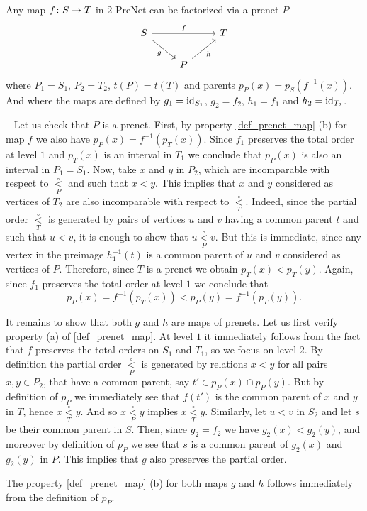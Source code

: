 \documentclass[letterpaper,12pt,leqno]{article}
\numberwithin{equation}{theorem}
\def\PreNet{\textrm{-}\mathrm{PreNet}}
\def\proof{\noindent{\em Proof:}\ }
\def\lesub{\mathop{<}\limits}
\def\pless{\lesub^\circ}
\begin{document}
\begin{lemma}
\label{lemma_map_factor}
Any map $f\colon S \to T$ in $2\PreNet$ can be factorized via a prenet $P$
$$
\begin{tikzcd}
S \ar[rr, "f"] \ar[dr, "g"'] && T \\
& P \ar[ur, "h"'] &
\end{tikzcd}
$$
where $P_1 = S_1$, $P_2 = T_2$, $t(P) = t(T)$ and parents $p_P(x) = p_S(f^{-1}(x))$. And where the maps are defined by $g_1 = \mathrm{id}_{S_1}$, $g_2 = f_2$, $h_1 = f_1$ and $h_2 = \mathrm{id}_{T_2}$.
\end{lemma}
\proof
Let us check that $P$ is a prenet. First, by property \ref{def_prenet_map} (b) for map $f$ we also have $p_P(x) = f^{-1}(p_T(x))$. Since $f_1$ preserves the total order at level $1$
and $p_T(x)$ is an interval in $T_1$ we conclude that $p_P(x)$ is also an interval in $P_1 = S_1$. Now, take $x$ and $y$ in $P_2$, which are incomparable with respect to $\pless_P$ and such that $x < y$.
This implies that $x$ and $y$ considered as vertices of $T_2$ are also incomparable with respect to $\pless_T$. Indeed, since the partial order $\pless_T$ is generated by pairs of vertices $u$ and $v$ having
a common parent $t$ and such that $u < v$, it is enough to show that $u \pless_P v$. But this is immediate, since any vertex in the preimage $h_1^{-1}(t)$ is a common parent of $u$ and $v$ considered as vertices of $P$.
Therefore, since $T$ is a prenet we obtain $p_T(x) < p_T(y)$. Again, since $f_1$ preserves the
total order at level $1$ we conclude that
$$
p_P(x) = f^{-1}(p_T(x)) < p_P(y) = f^{-1}(p_T(y)).
$$

It remains to show that both $g$ and $h$ are maps of prenets. Let us first verify property (a) of \ref{def_prenet_map}. At level $1$ it immediately follows from the fact that $f$ preserves the total orders
on $S_1$ and $T_1$, so we focus on level $2$. By definition the partial order $\pless_P$ is generated
by relations $x < y$ for all pairs $x, y \in P_2$, that have a common parent, say $t' \in p_P(x) \cap p_P(y)$. But by definition of $p_P$ we immediately see that $f(t')$ is
the common parent of $x$ and $y$ in $T$, hence $x \pless_T y$. And so $x \pless_P y$ implies $x \pless_T y$. Similarly, let $u < v$ in $S_2$ and let $s$ be their common parent in $S$. Then, since
$g_2 = f_2$ we have $g_2(x) < g_2(y)$, and moreover by definition of $p_P$ we see that $s$ is a common parent of $g_2(x)$ and $g_2(y)$ in $P$. This implies that $g$ also preserves the partial order.

The property \ref{def_prenet_map} (b) for both maps $g$ and $h$ follows immediately from the definition of $p_P$.
\end{document}
